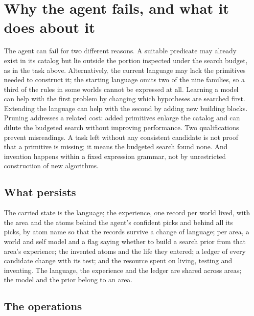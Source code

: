 \documentclass[11pt]{article}
\begin{document}
\section{Why the agent fails, and what it does about it}

The agent can fail for two different reasons. A suitable predicate may already exist in its catalog but lie outside the portion inspected under the search budget, as in the task above. Alternatively, the current language may lack the primitives needed to construct it; the starting language omits two of the nine families, so a third of the rules in some worlds cannot be expressed at all. Learning a model can help with the first problem by changing which hypotheses are searched first. Extending the language can help with the second by adding new building blocks. Pruning addresses a related cost: added primitives enlarge the catalog and can dilute the budgeted search without improving performance. Two qualifications prevent misreadings. A task left without any consistent candidate is not proof that a primitive is missing; it means the budgeted search found none. And invention happens within a fixed expression grammar, not by unrestricted construction of new algorithms.

\subsection{What persists}

The carried state is the language; the experience, one record per world lived, with the area and the atoms behind the agent's confident picks and behind all its picks, by atom name so that the records survive a change of language; per area, a world and self model and a flag saying whether to build a search prior from that area's experience; the invented atoms and the life they entered; a ledger of every candidate change with its test; and the resource spent on living, testing and inventing. The language, the experience and the ledger are shared across areas; the model and the prior belong to an area.

\subsection{The operations}
\end{document}
